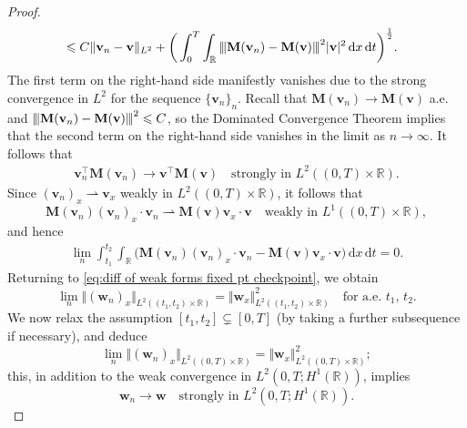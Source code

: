 \documentclass[10pt,a4paper]{amsart}
\newcommand{\bM}{\mathbf{M}}
\newcommand{\bv}{\mathbf{v}}
\newcommand{\bw}{\mathbf{w}}
\newcommand{\vertiii}[1]{{\left\vert\kern-0.25ex\left\vert\kern-0.25ex\left\vert #1 
    \right\vert\kern-0.25ex\right\vert\kern-0.25ex\right\vert}}
\renewcommand{\d}{\, \mathrm{d}}
\renewcommand{\leq}{\leqslant}
\begin{document}
\begin{proof}
\begin{equation}
\begin{aligned}
      &\leq C \Vert \bv_n - \bv \Vert_{L^2} + \bigg( \int_{0}^{T}\int_\mathbb{R} \vertiii{\bM(\bv_n) - \bM(\bv)}^2 |\bv|^2 \d x \d t \bigg)^{\frac{1}{2}}. 
    \end{aligned}
\end{equation}
The first term on the right-hand side manifestly vanishes due to the strong convergence in $L^2$ for the sequence $\{\bv_n\}_n$. Recall that $\bM(\bv_n) \to \bM(\bv)$ a.e.~ and $\vertiii{\bM(\bv_n) - \bM(\bv)}^2 \leq C$, so the Dominated Convergence Theorem implies that the second term on the right-hand side vanishes in the limit as $n\to\infty$. It follows that 
\begin{equation*}
    \begin{aligned}
      \bv_n^\intercal \bM(\bv_n) \to \bv^\intercal \bM(\bv) \quad \text{strongly in } L^2((0,T)\times\mathbb{R}). 
    \end{aligned}
\end{equation*}
Since $(\bv_n)_x \rightharpoonup \bv_x$ weakly in $L^2((0,T)\times\mathbb{R})$, it follows that 
\begin{equation*}
    \bM(\bv_n) (\bv_n)_x \cdot \bv_n \rightharpoonup \bM(\bv) \bv_x \cdot \bv \quad \text{weakly in } L^1((0,T)\times\mathbb{R}), 
\end{equation*}
and hence 
\begin{equation*}
      \begin{aligned} 
      \lim_n \int_{t_1}^{t_2}\int_\mathbb{R} \Big( \bM(\bv_n) (\bv_n)_x \cdot \bv_n - \bM(\bv) \bv_x \cdot \bv \Big) \d x \d t = 0. 
   \end{aligned}
\end{equation*}
Returning to \eqref{eq:diff of weak forms fixed pt checkpoint}, we obtain 
\begin{equation*}
    \lim_n \Vert (\bw_n)_x \Vert_{L^2((t_1,t_2)\times\mathbb{R})} = \Vert \bw_x \Vert^2_{L^2((t_1,t_2)\times\mathbb{R})} \quad \text{for a.e.~}t_1, \, t_2. 
\end{equation*}
We now relax the assumption $[t_1,t_2] \subsetneq [0,T]$ (by taking a further subsequence if necessary), and deduce 
\begin{equation*}
    \lim_n \Vert (\bw_n)_x \Vert_{L^2((0,T)\times\mathbb{R})} = \Vert \bw_x \Vert^2_{L^2((0,T)\times\mathbb{R})}; 
\end{equation*}
this, in addition to the weak convergence in $L^2(0,T;H^1(\mathbb{R}))$, implies 
\begin{equation}\label{eq:strong conv L2H1 for fixed pt}
    \bw_n \to \bw \quad \text{strongly in } L^2(0,T;H^1(\mathbb{R})). 
\end{equation}



\end{proof}
\end{document}
